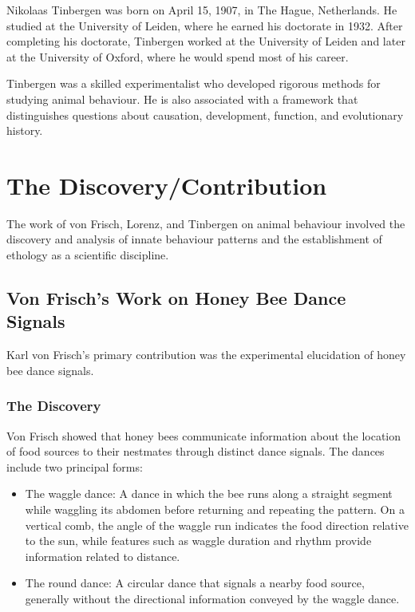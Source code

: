 Nikolaas Tinbergen was born on April 15, 1907, in The Hague, Netherlands. He studied at the University of Leiden, where he earned his doctorate in 1932. After completing his doctorate, Tinbergen worked at the University of Leiden and later at the University of Oxford, where he would spend most of his career.

Tinbergen was a skilled experimentalist who developed rigorous methods for studying animal behaviour. He is also associated with a framework that distinguishes questions about causation, development, function, and evolutionary history.

\section{The Discovery/Contribution}

The work of von Frisch, Lorenz, and Tinbergen on animal behaviour involved the discovery and analysis of innate behaviour patterns and the establishment of ethology as a scientific discipline.

\subsection{Von Frisch's Work on Honey Bee Dance Signals}

Karl von Frisch's primary contribution was the experimental elucidation of honey bee dance signals.

\subsubsection{The Discovery}

Von Frisch showed that honey bees communicate information about the location of food sources to their nestmates through distinct dance signals. The dances include two principal forms:

\begin{itemize}
\item The waggle dance: A dance in which the bee runs along a straight segment while waggling its abdomen before returning and repeating the pattern. On a vertical comb, the angle of the waggle run indicates the food direction relative to the sun, while features such as waggle duration and rhythm provide information related to distance.
\item The round dance: A circular dance that signals a nearby food source, generally without the directional information conveyed by the waggle dance.
\end{itemize}

